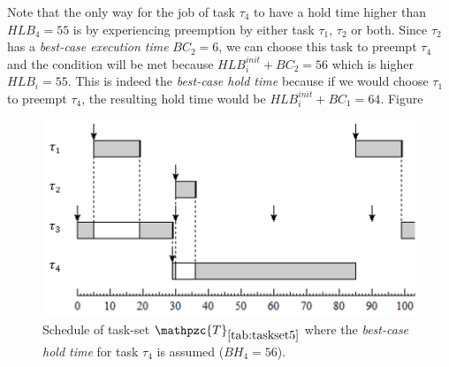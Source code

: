 \documentclass[fleqn]{article}
\begin{document}
Note that the only way for the job of task $\tau_4$ to have a hold time higher than $HLB_4=55$ is by experiencing preemption by either task $\tau_1$, $\tau_2$ or both. Since $\tau_2$ has a \textit{best-case execution time} $BC_2=6$, we can choose this task to preempt $\tau_4$ and the condition will be met because $HLB^{init}_i+BC_2= 56$ which is higher $HLB_i = 55$. This is indeed the \textit{best-case hold time} because if we would choose $\tau_1$ to preempt $\tau_4$, the resulting hold time would be $HLB^{init}_i+BC_1= 64$. Figure 

\begin{figure}[H]
	\centering
	\includegraphics[width=0.7\linewidth]{figures/bcht_2}
	\caption{Schedule of task-set $\mathpzc{T}_{\ref{tab:taskset5}}$ where the \textit{best-case hold time} for task $\tau_4$ is assumed ($BH_4 = 56$).}
	\label{fig:bcht_2}
\end{figure}
\end{document}
